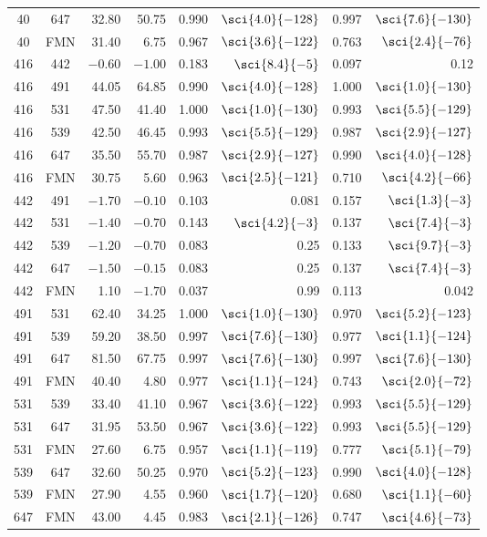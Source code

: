 \begin{longtable}{ccrrrrrr}
40  & 647 & 32.80 & 50.75 & 0.990 & $\sci{4.0}{-128}$ & 0.997 & $\sci{7.6}{-130}$ \\
40  & FMN & 31.40 & 6.75 & 0.967 & $\sci{3.6}{-122}$ & 0.763 & $\sci{2.4}{-76}$ \\
416 & 442 & $-0.60$ & $-1.00$ & 0.183 & $\sci{8.4}{-5}$ & 0.097 & 0.12 \\
416 & 491 & 44.05 & 64.85 & 0.990 & $\sci{4.0}{-128}$ & 1.000 & $\sci{1.0}{-130}$ \\
416 & 531 & 47.50 & 41.40 & 1.000 & $\sci{1.0}{-130}$ & 0.993 & $\sci{5.5}{-129}$ \\
416 & 539 & 42.50 & 46.45 & 0.993 & $\sci{5.5}{-129}$ & 0.987 & $\sci{2.9}{-127}$ \\
416 & 647 & 35.50 & 55.70 & 0.987 & $\sci{2.9}{-127}$ & 0.990 & $\sci{4.0}{-128}$ \\
416 & FMN & 30.75 & 5.60 & 0.963 & $\sci{2.5}{-121}$ & 0.710 & $\sci{4.2}{-66}$ \\
442 & 491 & $-1.70$ & $-0.10$ & 0.103 & 0.081 & 0.157 & $\sci{1.3}{-3}$ \\
442 & 531 & $-1.40$ & $-0.70$ & 0.143 & $\sci{4.2}{-3}$ & 0.137 & $\sci{7.4}{-3}$ \\
442 & 539 & $-1.20$ & $-0.70$ & 0.083 & 0.25 & 0.133 & $\sci{9.7}{-3}$ \\
442 & 647 & $-1.50$ & $-0.15$ & 0.083 & 0.25 & 0.137 & $\sci{7.4}{-3}$ \\
442 & FMN & 1.10 & $-1.70$ & 0.037 & 0.99 & 0.113 & 0.042 \\
491 & 531 & 62.40 & 34.25 & 1.000 & $\sci{1.0}{-130}$ & 0.970 & $\sci{5.2}{-123}$ \\
491 & 539 & 59.20 & 38.50 & 0.997 & $\sci{7.6}{-130}$ & 0.977 & $\sci{1.1}{-124}$ \\
491 & 647 & 81.50 & 67.75 & 0.997 & $\sci{7.6}{-130}$ & 0.997 & $\sci{7.6}{-130}$ \\
491 & FMN & 40.40 & 4.80 & 0.977 & $\sci{1.1}{-124}$ & 0.743 & $\sci{2.0}{-72}$ \\
531 & 539 & 33.40 & 41.10 & 0.967 & $\sci{3.6}{-122}$ & 0.993 & $\sci{5.5}{-129}$ \\
531 & 647 & 31.95 & 53.50 & 0.967 & $\sci{3.6}{-122}$ & 0.993 & $\sci{5.5}{-129}$ \\
531 & FMN & 27.60 & 6.75 & 0.957 & $\sci{1.1}{-119}$ & 0.777 & $\sci{5.1}{-79}$ \\
539 & 647 & 32.60 & 50.25 & 0.970 & $\sci{5.2}{-123}$ & 0.990 & $\sci{4.0}{-128}$ \\
539 & FMN & 27.90 & 4.55 & 0.960 & $\sci{1.7}{-120}$ & 0.680 & $\sci{1.1}{-60}$ \\
647 & FMN & 43.00 & 4.45 & 0.983 & $\sci{2.1}{-126}$ & 0.747 & $\sci{4.6}{-73}$ \\
\end{longtable}
\endgroup